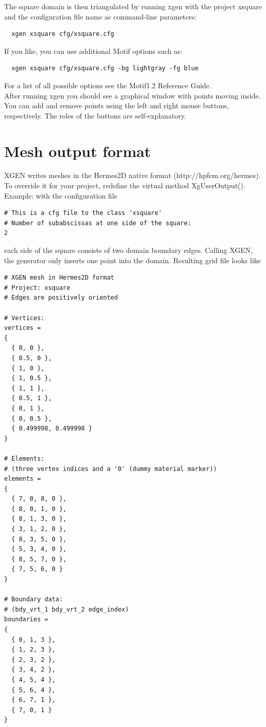 \documentclass[12pt]{article}
\begin{document}
  \noindent
  The square domain is then triangulated by running xgen with the 
  project xsquare and the configuration file name as command-line 
  parameters:

  \begin{verbatim}  
  xgen xsquare cfg/xsquare.cfg
  \end{verbatim}
  If you like, you can use additional Motif options such as:

  \begin{verbatim}  
  xgen xsquare cfg/xsquare.cfg -bg lightgray -fg blue 
  \end{verbatim}
  For a list of all possible options see the Motif1.2 Reference Guide.\\

  \noindent
  After running xgen you should see a graphical window with 
  points moving inside. You can add and remove points using 
  the left and right mouse buttons, respectively. The roles of 
  the buttons are self-explanatory. 

  \section{Mesh output format} \label{out_form}

  XGEN writes meshes in the Hermes2D native format (http://hpfem.org/hermes).
  To override it for your project, redefine the virtual method XgUserOutput().\\

  \noindent
  Example: with the configuration file 

  \begin{verbatim}
# This is a cfg file to the class 'xsquare'
# Number of subabscissas at one side of the square:
2  
  \end{verbatim}
  each side of the square consists of two domain boundary edges. Calling XGEN, the generator
  only inserts one point into the domain. Resulting grid file looks like
  \begin{verbatim}
# XGEN mesh in Hermes2D format
# Project: xsquare
# Edges are positively oriented

# Vertices:
vertices = 
{
  { 0, 0 },
  { 0.5, 0 },
  { 1, 0 },
  { 1, 0.5 },
  { 1, 1 },
  { 0.5, 1 },
  { 0, 1 },
  { 0, 0.5 },
  { 0.499998, 0.499998 }
}

# Elements:
# (three vertex indices and a '0' (dummy material marker))
elements =
{
  { 7, 0, 8, 0 },
  { 8, 0, 1, 0 },
  { 8, 1, 3, 0 },
  { 3, 1, 2, 0 },
  { 8, 3, 5, 0 },
  { 5, 3, 4, 0 },
  { 8, 5, 7, 0 },
  { 7, 5, 6, 0 }
}

# Boundary data:
# (bdy_vrt_1 bdy_vrt_2 edge_index)
boundaries =
{
  { 0, 1, 3 },
  { 1, 2, 3 },
  { 2, 3, 2 },
  { 3, 4, 2 },
  { 4, 5, 4 },
  { 5, 6, 4 },
  { 6, 7, 1 },
  { 7, 0, 1 }
}
  \end{verbatim}
\end{document}
